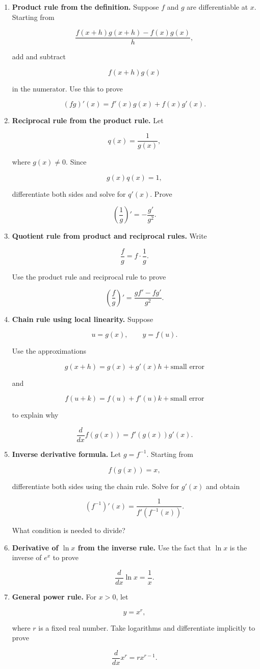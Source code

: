 \begin{enumerate}
\item \textbf{Product rule from the definition.}
Suppose \(f\) and \(g\) are differentiable at \(x\).  Starting from

\[
\frac{f(x+h)g(x+h)-f(x)g(x)}{h},
\]

add and subtract

\[
f(x+h)g(x)
\]

in the numerator.  Use this to prove

\[
(fg)'(x)=f'(x)g(x)+f(x)g'(x).
\]

\item \textbf{Reciprocal rule from the product rule.}
Let

\[
q(x)=\frac1{g(x)},
\]

where \(g(x)\neq0\).  Since

\[
g(x)q(x)=1,
\]

differentiate both sides and solve for \(q'(x)\).  Prove

\[
\left(\frac1g\right)'=-\frac{g'}{g^2}.
\]

\item \textbf{Quotient rule from product and reciprocal rules.}
Write

\[
\frac{f}{g}=f\cdot\frac1g.
\]

Use the product rule and reciprocal rule to prove

\[
\left(\frac fg\right)'=\frac{gf'-fg'}{g^2}.
\]

\item \textbf{Chain rule using local linearity.}
Suppose

\[
u=g(x),
\qquad
y=f(u).
\]

Use the approximations

\[
g(x+h)=g(x)+g'(x)h+\text{small error}
\]

and

\[
f(u+k)=f(u)+f'(u)k+\text{small error}
\]

to explain why

\[
\frac{d}{dx}f(g(x))=f'(g(x))g'(x).
\]

\item \textbf{Inverse derivative formula.}
Let \(g=f^{-1}\).  Starting from

\[
f(g(x))=x,
\]

differentiate both sides using the chain rule.  Solve for \(g'(x)\) and obtain

\[
(f^{-1})'(x)=\frac1{f'(f^{-1}(x))}.
\]

What condition is needed to divide?

\item \textbf{Derivative of \(\ln x\) from the inverse rule.}
Use the fact that \(\ln x\) is the inverse of \(e^x\) to prove

\[
\frac{d}{dx}\ln x=\frac1x.
\]

\item \textbf{General power rule.}
For \(x>0\), let

\[
y=x^r,
\]

where \(r\) is a fixed real number.  Take logarithms and differentiate implicitly to prove

\[
\frac{d}{dx}x^r=rx^{r-1}.
\]
\end{enumerate}

